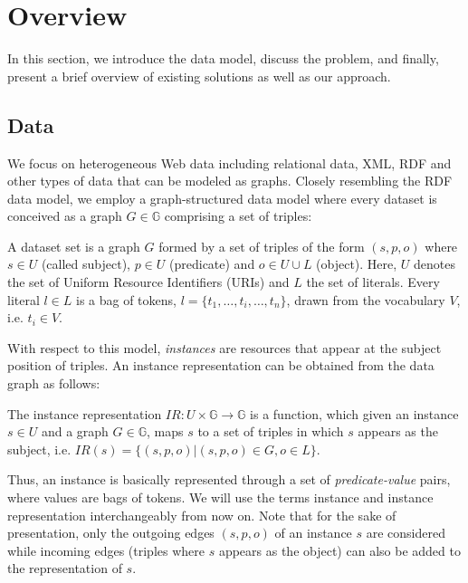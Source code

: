 \section{Overview}
In this section, we introduce the data model, discuss the problem, and finally, present a brief overview of existing solutions as well as our approach.

\subsection{Data} We focus on heterogeneous Web data including relational data, XML, RDF and other types of data that can be modeled as graphs. Closely resembling the RDF data model, we employ a graph-structured data model where every dataset is conceived as a graph $G \in\mathbb{G}$ comprising a set of triples: 

\begin{definition} A dataset set is a graph $G$ formed by a set of triples of the form $(s, p, o)$ where $s \in U$ (called subject), $p \in U$ (predicate) and $o \in U \cup L$ (object). Here, $U$ denotes the set of Uniform Resource Identifiers (URIs) and $L$ the set of literals. Every literal $l \in L$ is a bag of tokens, $l = \{t_1,\ldots,t_i,\ldots,t_n\}$, drawn from the vocabulary $V$, i.e. $t_i \in V$.  
\end{definition} 

With respect to this model, \emph{instances} are resources that appear at the subject position of triples. An instance representation can be obtained from the data graph as follows:

\begin{definition} The instance representation $IR: U \times \mathbb{G} \rightarrow \mathbb{G}$ is a function, which given an instance $s \in U$ and a graph $G \in \mathbb{G}$, maps $s$ to a set of triples in which $s$ appears as the subject, i.e. $IR(s) = \{ (s, p, o) | (s, p, o) \in G, o \in L \}$. 
\end{definition} 

Thus, an instance is basically represented through a set of \emph{predicate-value} pairs, where values are bags of tokens.  
We will use the terms instance and instance representation interchangeably from now on. Note that for the sake of presentation, only the outgoing edges $(s, p, o)$ of an instance $s$ are considered while incoming edges (triples where $s$ appears as the object) can also be added to the representation of $s$. 

